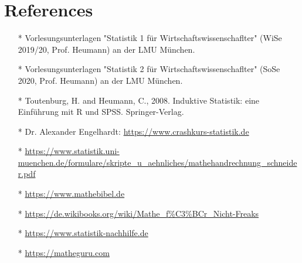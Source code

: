 \documentclass[a4paper]{article}
\begin{document}
\newpage




\section*{References}

\begin{itemize}
    \item[*] Vorlesungsunterlagen "Statistik 1 für Wirtschaftswissenschaflter" (WiSe 2019/20, Prof. Heumann) an der LMU München.
    \item[*] Vorlesungsunterlagen "Statistik 2 für Wirtschaftswissenschaflter" (SoSe 2020, Prof. Heumann) an der LMU München.
    \item[*] Toutenburg, H. and Heumann, C., 2008. Induktive Statistik: eine Einführung mit R und SPSS. Springer-Verlag.
    \item[*] Dr. Alexander Engelhardt: \url{https://www.crashkurs-statistik.de}
    \item[*] \url{https://www.statistik.uni-muenchen.de/formulare/skripte_u_aehnliches/mathehandrechnung_schneider.pdf}
    \item[*] \url{https://www.mathebibel.de}
    \item[*] \url{https://de.wikibooks.org/wiki/Mathe_f\%C3\%BCr_Nicht-Freaks}
    \item[*] \url{https://www.statistik-nachhilfe.de}
    \item[*] \url{https://matheguru.com}
\end{itemize}
\end{document}
